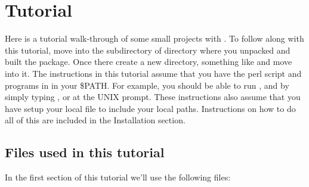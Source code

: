 \section{Tutorial}
\label{section:tutorial}

Here is a tutorial walk-through of some small projects with
. To follow along with this tutorial, move into the
 subdirectory of  directory
where you unpacked and built the  package. Once there
create a new directory, something like  and move
into it. The instructions in this tutorial assume that you have the
 perl script and
 programs in  in your
\$PATH\@. For example, you should be able to run ,
 and  by simply typing
,  or  at the
UNIX prompt.  These instructions also assume that you have setup your
local  file to include your local
paths. Instructions on how to do all of this are included in the
Installation section.

\subsection{Files used in this tutorial}

In the first section of this tutorial we'll use the following files:

